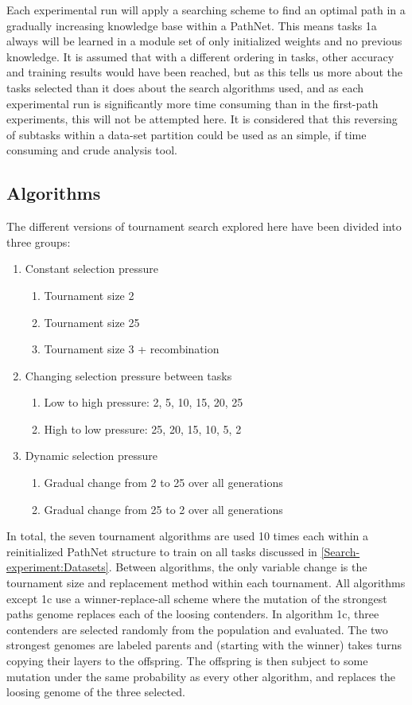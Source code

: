 Each experimental run will apply a searching scheme to find an optimal path in a gradually increasing knowledge base within a PathNet. This means tasks 1a always will be learned in a module set of only initialized weights and no previous knowledge. It is assumed that with a different ordering in tasks, other  accuracy and training results would have been reached, but as this tells us more about the tasks selected than it does about the search algorithms used, and as each experimental run is significantly more time consuming than in the first-path experiments, this will not be attempted here. It is considered that this reversing of subtasks within a data-set partition could be used as an simple, if time consuming and crude analysis tool.

\subsection{Algorithms}\label{Search-experiment:Algorithms}
The different versions of tournament search explored here have been divided into three groups: 
\begin{enumerate}
    \item Constant selection pressure
    \begin{enumerate}
        \item Tournament size 2
        \item Tournament size 25
        \item Tournament size 3 + recombination
    \end{enumerate}
    \item Changing selection pressure between tasks
    \begin{enumerate}
        \item Low to high pressure: 2, 5, 10, 15, 20, 25
        \item High to low pressure: 25, 20, 15, 10, 5, 2
    \end{enumerate}
    \item Dynamic selection pressure
    \begin{enumerate}
        \item Gradual change from 2 to 25 over all generations
        \item Gradual change from 25 to 2 over all generations
    \end{enumerate}
\end{enumerate}
In total, the seven tournament algorithms are used 10 times each within a reinitialized PathNet structure to train on all tasks discussed in \ref{Search-experiment:Datasets}. Between algorithms, the only variable change is the tournament size and replacement method within each tournament. All algorithms except 1c use a winner-replace-all scheme where the mutation of the strongest paths genome replaces each of the loosing contenders. In algorithm 1c, three contenders are selected randomly from the population and evaluated. The two strongest genomes are labeled parents and (starting with the winner) takes turns copying their layers to the offspring. The offspring is then subject to some mutation under the same probability as every other algorithm, and replaces the loosing genome of the three selected. 
